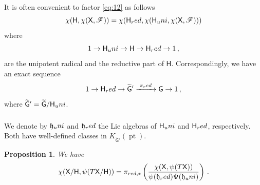 \documentclass[14pt]{extarticle}
\newcommand{\bG}{\mathsf{G}}
\newcommand{\bH}{\mathsf{H}}
\newcommand{\bX}{\mathsf{X}}
\newcommand{\cF}{\mathscr{F}}
\newcommand{\fh}{\mathfrak{h}}
\newcommand{\uni}{\textup{uni}}
\newcommand{\red}{\textup{red}}
\DeclareMathOperator{\pt}{pt}
\newtheorem{Proposition}[Lemma]{Proposition}
\theoremstyle{definition}
\begin{document}
\subsubsection{}

It is often convenient to factor \eqref{eq:12} as follows
%
\begin{equation}
  \label{eq:50}
  \chi(\bH, \chi(\bX, \cF)) = \chi(\bH_\red, \chi(\bH_\uni,\chi(\bX, \cF)))
\end{equation}
%
where 
\[
  1 \to \bH_\uni \to \bH \to \bH_\red \to 1 \,, 
\]
are the unipotent radical and the reductive part of $\bH$.
Correspondingly, we have an exact sequence
%
\begin{equation}
  \label{eq:55}
  1 \to \bH_\red \to \widetilde{\bG}' \xrightarrow{\,\, \pi_\red \, \,} \bG \to
1 \,, 
\end{equation}
%
where $\widetilde{\bG}'=\widetilde{\bG}/ \bH_\uni$. 





\subsubsection{}\label{s_push_uni} 
We
denote by $\fh_\uni$ and $\fh_\red$ the Lie algebras of $\bH_\uni$ and
$\bH_\red$,  respectively. Both have well-defined classes in
$K_{\widetilde{\bG}'}(\pt)$. 

\begin{Proposition}
 We have 
  \begin{equation}
    \label{eq:48}
    \chi(\bX/\bH, \psi(T \bX/\bH)) = \pi_{\red,*}  \left( \frac{\chi(\bX, \psi(
                             T \bX))}{\psi(\fh_\red) \Psi(\fh_\uni)}
                         \right) 
                           \,. 
                         \end{equation}
\end{Proposition}
\end{document}
